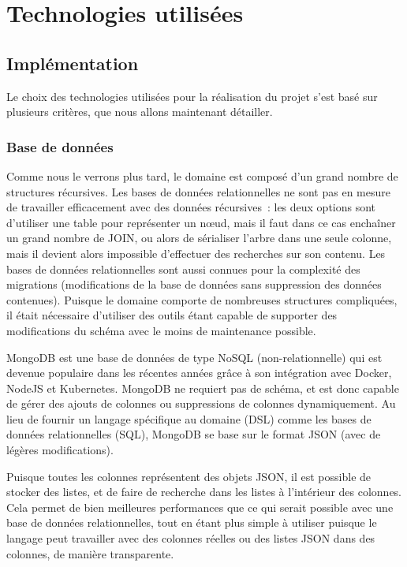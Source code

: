 \section{Technologies utilisées}\label{sec:technologies-utilisees}

\subsection{Implémentation}\label{subsec:livrables-et-developpement}

Le choix des technologies utilisées pour la réalisation du projet s’est basé sur plusieurs critères, que nous allons maintenant détailler.

\subsubsection{Base de données}

Comme nous le verrons plus tard, le domaine est composé d’un grand nombre de structures récursives.
Les bases de données relationnelles ne sont pas en mesure de travailler efficacement avec des données récursives~: les deux options sont d’utiliser une table pour représenter un nœud, mais il faut dans ce cas enchaîner un grand nombre de JOIN, ou alors de sérialiser l’arbre dans une seule colonne, mais il devient alors impossible d’effectuer des recherches sur son contenu.
Les bases de données relationnelles sont aussi connues pour la complexité des migrations (modifications de la base de données sans suppression des données contenues).
Puisque le domaine comporte de nombreuses structures compliquées, il était nécessaire d’utiliser des outils étant capable de supporter des modifications du schéma avec le moins de maintenance possible.

\uparagraph
MongoDB est une base de données de type NoSQL (non-relationnelle) qui est devenue populaire dans les récentes années grâce à son intégration avec Docker, NodeJS et Kubernetes.
MongoDB ne requiert pas de schéma, et est donc capable de gérer des ajouts de colonnes ou suppressions de colonnes dynamiquement.
Au lieu de fournir un langage spécifique au domaine (DSL) comme les bases de données relationnelles (SQL), MongoDB se base sur le format JSON (avec de légères modifications).

Puisque toutes les colonnes représentent des objets JSON, il est possible de stocker des listes, et de faire de recherche dans les listes à l’intérieur des colonnes.
Cela permet de bien meilleures performances que ce qui serait possible avec une base de données relationnelles, tout en étant plus simple à utiliser puisque le langage peut travailler avec des colonnes réelles ou des listes JSON dans des colonnes, de manière transparente.

